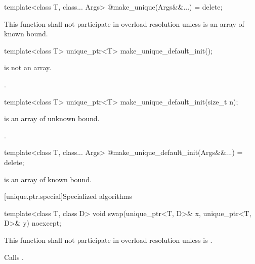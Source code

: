 %
\begin{itemdecl}
template<class T, class... Args> @\unspec@ make_unique(Args&&...) = delete;
\end{itemdecl}

\begin{itemdescr}
\pnum
\remarks This function shall not participate in overload resolution unless  is an array of known bound.

\end{itemdescr}

%
\begin{itemdecl}
template<class T> unique_ptr<T> make_unique_default_init();
\end{itemdecl}

\begin{itemdescr}
\pnum
\constraints
{} is not an array.

\pnum
\returns
{}.
\end{itemdescr}

%
\begin{itemdecl}
template<class T> unique_ptr<T> make_unique_default_init(size_t n);
\end{itemdecl}

\begin{itemdescr}
\pnum
\constraints
{} is an array of unknown bound.

\pnum
\returns
{}.
\end{itemdescr}

%
\begin{itemdecl}
template<class T, class... Args> @\unspec@ make_unique_default_init(Args&&...) = delete;
\end{itemdecl}

\begin{itemdescr}
\pnum
\constraints
{} is an array of known bound.
\end{itemdescr}

[unique.ptr.special]{Specialized algorithms}

%
\begin{itemdecl}
template<class T, class D> void swap(unique_ptr<T, D>& x, unique_ptr<T, D>& y) noexcept;
\end{itemdecl}

\begin{itemdescr}
\pnum
\remarks This function shall not participate in overload resolution
unless  is .

\pnum
\effects Calls .
\end{itemdescr}

